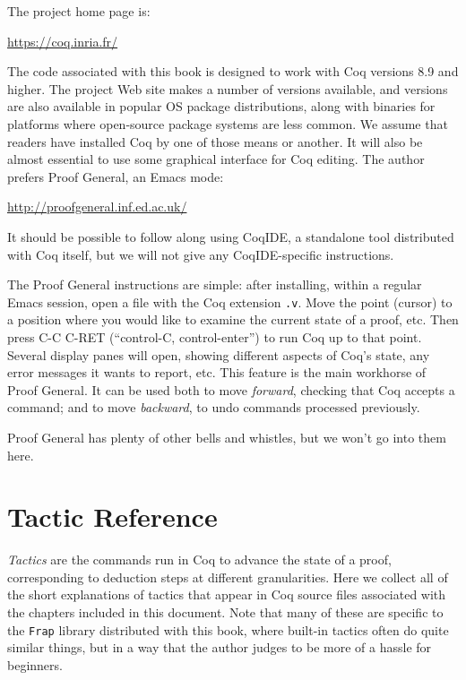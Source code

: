 \documentclass{amsbook}
\theoremstyle{definition}
\theoremstyle{remark}
\numberwithin{section}{chapter}
\numberwithin{equation}{chapter}
\begin{document}
The project home page is:
\begin{center}
  \url{https://coq.inria.fr/}
\end{center}
The code associated with this book is designed to work with Coq versions 8.9 and higher.
The project Web site makes a number of versions available, and versions are also available in popular OS package distributions, along with binaries for platforms where open-source package systems are less common.
We assume that readers have installed Coq by one of those means or another.
It will also be almost essential to use some graphical interface for Coq editing.
The author prefers Proof General, an Emacs mode:
\begin{center}
  \url{http://proofgeneral.inf.ed.ac.uk/}
\end{center}
It should be possible to follow along using CoqIDE, a standalone tool distributed with Coq itself, but we will not give any CoqIDE-specific instructions.

The Proof General instructions are simple: after installing, within a regular Emacs session, open a file with the Coq extension \texttt{.v}.
Move the point (cursor) to a position where you would like to examine the current state of a proof, etc.
Then press C-C C-RET (``control-C, control-enter'') to run Coq up to that point.
Several display panes will open, showing different aspects of Coq's state, any error messages it wants to report, etc.
This feature is the main workhorse of Proof General.
It can be used both to move \emph{forward}, checking that Coq accepts a command; and to move \emph{backward}, to undo commands processed previously.

Proof General has plenty of other bells and whistles, but we won't go into them here.

\section{Tactic Reference}

\emph{Tactics} are the commands run in Coq to advance the state of a proof, corresponding to deduction steps at different granularities.
Here we collect all of the short explanations of tactics that appear in Coq source files associated with the chapters included in this document.
Note that many of these are specific to the \texttt{Frap} library distributed with this book, where built-in tactics often do quite similar things, but in a way that the author judges to be more of a hassle for beginners.
\end{document}
